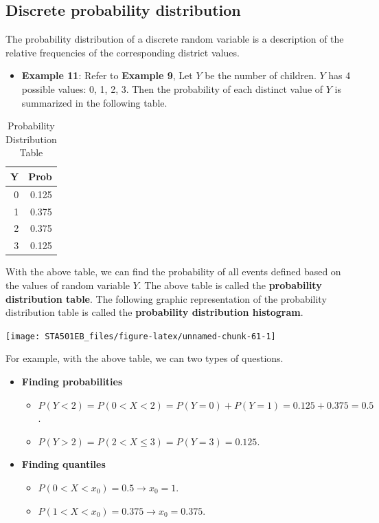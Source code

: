 \documentclass[
]{book}
\providecommand{\tightlist}{%
  \setlength{\itemsep}{0pt}\setlength{\parskip}{0pt}}
\begin{document}
\hypertarget{discrete-probability-distribution}{%
\subsection{Discrete probability distribution}\label{discrete-probability-distribution}}

The probability distribution of a discrete random variable is a description of the relative frequencies of the corresponding district values.

\begin{itemize}
\tightlist
\item
  \textbf{Example 11}: Refer to \textbf{Example 9}, Let \(Y\) be the number of children. \(Y\) has 4 possible values: 0, 1, 2, 3. Then the probability of each distinct value of \(Y\) is summarized in the following table.
\end{itemize}

\begin{table}

\caption{\label{tab:unnamed-chunk-60}Probability Distribution Table}
\centering
\begin{tabular}[t]{r|r}
\hline
Y & Prob\\
\hline
0 & 0.125\\
\hline
1 & 0.375\\
\hline
2 & 0.375\\
\hline
3 & 0.125\\
\hline
\end{tabular}
\end{table}

With the above table, we can find the probability of all events defined based on the values of random variable \(Y\). The above table is called the \textbf{probability distribution table}. The following graphic representation of the probability distribution table is called the \textbf{probability distribution histogram}.

\begin{center}\texttt{[image: STA501EB\_files/figure-latex/unnamed-chunk-61-1]} \end{center}

For example, with the above table, we can two types of questions.

\begin{itemize}
\tightlist
\item
  \textbf{Finding probabilities}

  \begin{itemize}
  \tightlist
  \item
    \(P(Y < 2) = P(0< X < 2) = P(Y=0) + P(Y = 1) = 0.125 + 0.375 = 0.5\).
  \item
    \(P(Y > 2) = P(2 < X \le 3) = P(Y = 3) = 0.125\).
  \end{itemize}
\item
  \textbf{Finding quantiles}

  \begin{itemize}
  \tightlist
  \item
    \(P(0< X < x_0) = 0.5 \to x_0 = 1.\)
  \item
    \(P(1<X<x_0) = 0.375 \to x_0 = 0.375.\)
  \end{itemize}
\end{itemize}
\end{document}
